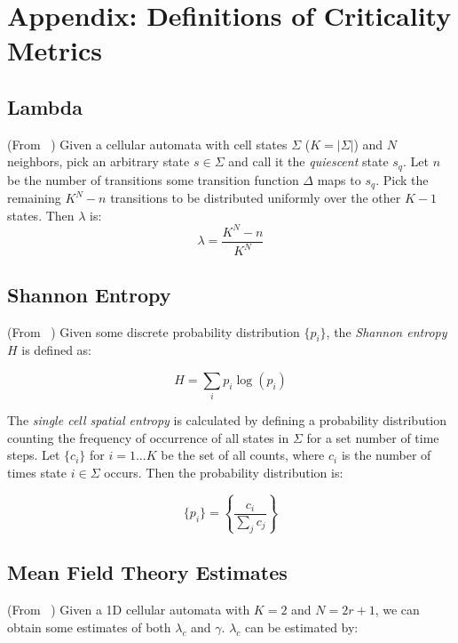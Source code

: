 \documentclass[a4paper,11pt]{article}
\begin{document}
\newpage

\section{Appendix: Definitions of Criticality Metrics}
\label{app:Defs}

\subsection{Lambda}
\label{appA:lambda}
(From \citeauthor{la90}~\cite{la90}) Given a cellular automata with cell states $\Sigma$ ($K = |\Sigma|$) and $N$ neighbors, pick an arbitrary state $s \in \Sigma$ and call it the \textit{quiescent} state $s_q$. Let $n$ be the number of transitions some transition function $\Delta$ maps to $s_q$. Pick the remaining $K^N - n$ transitions to be distributed uniformly over the other $K-1$ states. Then $\lambda$ is:
\begin{equation}
\lambda = \frac{K^N - n}{K^N}
\end{equation}

\subsection{Shannon Entropy}
\label{appA:entrop}
(From \citeauthor{li90b}~\cite{li90b}) Given some discrete probability distribution $\{p_i\}$, the \textit{Shannon entropy} $H$ is defined as:

\begin{equation}
H = \sum_i p_i \log(p_i)
\end{equation}

The \textit{single cell spatial entropy} is calculated by defining a probability distribution counting the frequency of occurrence of all states in $\Sigma$ for a set number of time steps. Let $\{c_i\}$ for $i = 1...K$ be the set of all counts, where $c_i$ is the number of times state $i \in \Sigma$ occurs. Then the probability distribution is:

\begin{equation}
\{p_i\} = \left\{\frac{c_i}{\sum_j c_j}\right\}
\end{equation}

\subsection{Mean Field Theory Estimates}
\label{appA:MFT}
(From \citeauthor{li90b}~\cite{li90b}) Given a 1D cellular automata with $K=2$ and $N = 2r+1$, we can obtain some estimates of both $\lambda_c$ and $\gamma$. $\lambda_c$ can be estimated by:
\end{document}
